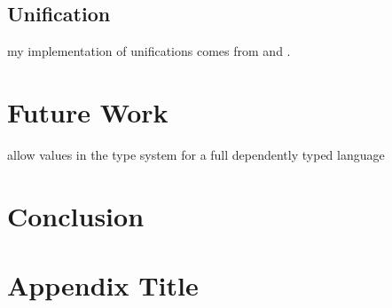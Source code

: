 \documentclass[12pt]{report}
\begin{document}
\section{Unification}
my implementation of unifications comes from \cite{Norvig1991CorrectingAW} and \cite{inproceedings}.


\chapter{Future Work}
allow values in the type system for a full dependently typed language
% 

\chapter{Conclusion}
% 



\printbibliography

\appendix
\chapter{Appendix Title}
% 
\end{document}
